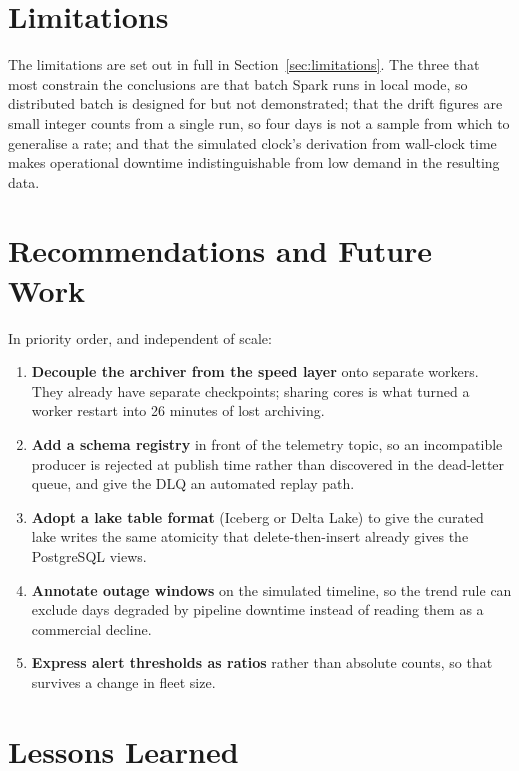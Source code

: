 \section{Limitations}

The limitations are set out in full in Section~\ref{sec:limitations}. The
three that most constrain the conclusions are that batch Spark runs in
local mode, so distributed batch is designed for but not demonstrated;
that the drift figures are small integer counts from a single run, so
four days is not a sample from which to generalise a rate; and that the
simulated clock's derivation from wall-clock time makes operational
downtime indistinguishable from low demand in the resulting data.

\section{Recommendations and Future Work}

In priority order, and independent of scale:

\begin{enumerate}
  \item \textbf{Decouple the archiver from the speed layer} onto
        separate workers. They already have separate checkpoints; sharing
        cores is what turned a worker restart into 26 minutes of lost
        archiving.
  \item \textbf{Add a schema registry} in front of the telemetry topic,
        so an incompatible producer is rejected at publish time rather
        than discovered in the dead-letter queue, and give the DLQ an
        automated replay path.
  \item \textbf{Adopt a lake table format} (Iceberg or Delta Lake) to
        give the curated lake writes the same atomicity that
        delete-then-insert already gives the PostgreSQL views.
  \item \textbf{Annotate outage windows} on the simulated timeline, so
        the  trend rule can exclude days
        degraded by pipeline downtime instead of reading them as a
        commercial decline.
  \item \textbf{Express alert thresholds as ratios} rather than absolute
        counts, so that  survives a change in
        fleet size.
\end{enumerate}

\section{Lessons Learned}

